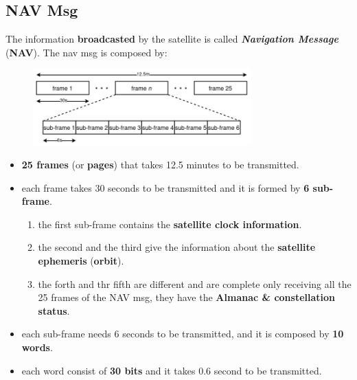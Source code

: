 \subsection{NAV Msg}
The information \textbf{broadcasted} by the satellite is called \textbf{\textit{Navigation Message}} (\textbf{NAV}). The nav msg is composed by:
\begin{figure}[h]
    \centering
    \includegraphics[width=0.75\textwidth]{img/gps_frame}
\end{figure}
\begin{itemize}[nosep]
    \item \textbf{25 frames} (or \textbf{pages}) that takes 12.5 minutes to be transmitted.
    \item each frame takes 30 seconds to be transmitted and it is formed by \textbf{6 sub-frame}.
    \begin{enumerate}[nosep]
        \item the first sub-frame contains the \textbf{satellite clock information}.
        \item the second and the third give the information about the \textbf{satellite ephemeris} (\textbf{orbit}).
        \item the forth and thr fifth are different and are complete only receiving all the 25 frames of the NAV msg, they have the \textbf{Almanac \& constellation status}.
    \end{enumerate}
    \item each sub-frame needs 6 seconds to be transmitted, and it is composed by \textbf{10 words}.
    \item each word consist of \textbf{30 bits} and it takes 0.6 second to be transmitted.
\end{itemize}

\newpage
